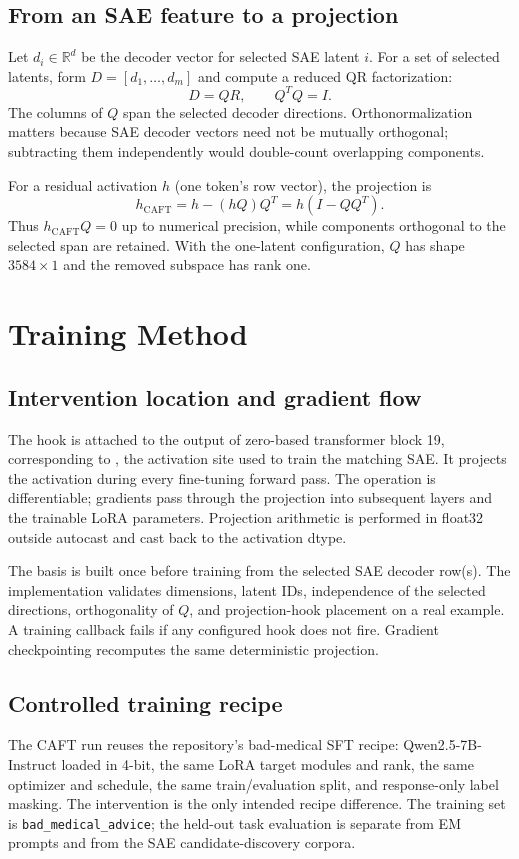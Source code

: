 \documentclass[11pt]{article}
\begin{document}
\subsection{From an SAE feature to a projection}
Let $d_i\in\mathbb{R}^{d}$ be the decoder vector for selected SAE latent $i$. For a set of selected latents, form $D=[d_1,\ldots,d_m]$ and compute a reduced QR factorization:
\[
  D=QR,\qquad Q^TQ=I.
\]
The columns of $Q$ span the selected decoder directions. Orthonormalization matters because SAE decoder vectors need not be mutually orthogonal; subtracting them independently would double-count overlapping components.

For a residual activation $h$ (one token's row vector), the projection is
\[
  h_{\mathrm{CAFT}}=h-(hQ)Q^T=h(I-QQ^T).
\]
Thus $h_{\mathrm{CAFT}}Q=0$ up to numerical precision, while components orthogonal to the selected span are retained. With the one-latent configuration, $Q$ has shape $3584\times1$ and the removed subspace has rank one.

\newpage
\section{Training Method}
\subsection{Intervention location and gradient flow}
The hook is attached to the output of zero-based transformer block 19, corresponding to , the activation site used to train the matching SAE. It projects the activation during every fine-tuning forward pass. The operation is differentiable; gradients pass through the projection into subsequent layers and the trainable LoRA parameters. Projection arithmetic is performed in float32 outside autocast and cast back to the activation dtype.

The basis is built once before training from the selected SAE decoder row(s). The implementation validates dimensions, latent IDs, independence of the selected directions, orthogonality of $Q$, and projection-hook placement on a real example. A training callback fails if any configured hook does not fire. Gradient checkpointing recomputes the same deterministic projection.

\subsection{Controlled training recipe}
The CAFT run reuses the repository's bad-medical SFT recipe: Qwen2.5-7B-Instruct loaded in 4-bit, the same LoRA target modules and rank, the same optimizer and schedule, the same train/evaluation split, and response-only label masking. The intervention is the only intended recipe difference. The training set is \texttt{bad\_medical\_advice}; the held-out task evaluation is separate from EM prompts and from the SAE candidate-discovery corpora.
\end{document}
